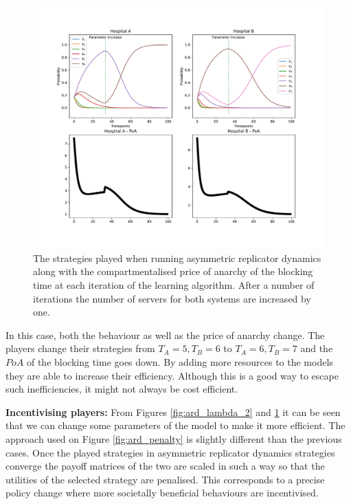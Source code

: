 \begin{figure}[H]
    \includegraphics[width=\textwidth]{imgs/asymmetric_rd_and_PoA/asymmetric_increase_C.pdf}
    \caption{
        The strategies played when running asymmetric replicator dynamics
        along with the compartmentalised price of anarchy of the blocking time 
        at each iteration of the learning algorithm. After a number of 
        iterations the number of servers for both systems are increased by one.
    }
    \label{fig:ard_num_of_servers}
\end{figure}

In this case, both the behaviour as well as the price of anarchy change.
The players change their strategies from \(T_A = 5, T_B = 6\) to 
\(T_A = 6, T_B = 7\) and the \(PoA\) of the blocking time goes down.
By adding more resources to the models they are able to increase their 
efficiency.
Although this is a good way to escape such inefficiencies, it might not always
be cost efficient.

\textbf{Incentivising players:}
From Figures \ref{fig:ard_lambda_2} and \ref{fig:ard_num_of_servers} it can be
seen that we can change some parameters of the model to make it more efficient.
The approach used on Figure \ref{fig:ard_penalty} is slightly different than 
the previous cases.
Once the played strategies in asymmetric replicator dynamics strategies 
converge the payoff matrices of the two are scaled in such a way so that the 
utilities of the selected strategy are penalised. This corresponds to a precise
policy change where more societally beneficial behaviours are incentivised.

